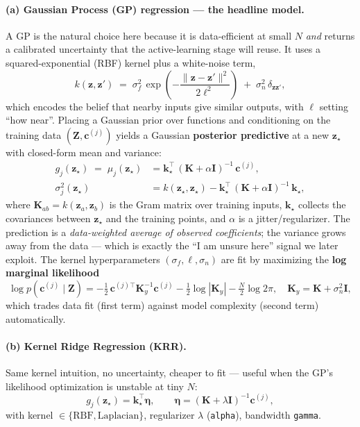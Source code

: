\documentclass[11pt]{article}
\newcommand{\bz}{\mathbf{z}}
\newcommand{\bc}{\mathbf{c}}
\newcommand{\bK}{\mathbf{K}}
\newcommand{\bI}{\mathbf{I}}
\begin{document}
\paragraph{(a) Gaussian Process (GP) regression --- the headline model.} A GP is the natural
choice here because it is data-efficient at small $N$ \emph{and} returns a calibrated uncertainty
that the active-learning stage will reuse. It uses a squared-exponential (RBF) kernel plus a
white-noise term,
\begin{equation}
k(\bz,\bz') \;=\; \sigma_f^2\,\exp\!\left(-\frac{\|\bz-\bz'\|^2}{2\ell^2}\right) \;+\; \sigma_n^2\,\delta_{\bz\bz'} ,
\end{equation}
which encodes the belief that nearby inputs give similar outputs, with $\ell$ setting ``how near''.
Placing a Gaussian prior over functions and conditioning on the training data
$(\mathbf{Z},\bc^{(j)})$ yields a Gaussian \textbf{posterior predictive} at a new $\bz_\star$ with
closed-form mean and variance:
\begin{align}
g_j(\bz_\star) \;=\; \mu_j(\bz_\star) &= \mathbf{k}_\star^\top\,(\bK+\alpha\bI)^{-1}\,\bc^{(j)},\\[2pt]
\sigma_j^2(\bz_\star) &= k(\bz_\star,\bz_\star) - \mathbf{k}_\star^\top\,(\bK+\alpha\bI)^{-1}\,\mathbf{k}_\star,
\end{align}
where $\bK_{ab}=k(\bz_a,\bz_b)$ is the Gram matrix over training inputs, $\mathbf{k}_\star$ collects
the covariances between $\bz_\star$ and the training points, and $\alpha$ is a jitter/regularizer.
The prediction is a \emph{data-weighted average of observed coefficients}; the variance grows away
from the data --- which is exactly the ``I am unsure here'' signal we later exploit. The kernel
hyperparameters $(\sigma_f,\ell,\sigma_n)$ are fit by maximizing the \textbf{log marginal
likelihood}
\begin{equation}
\log p(\bc^{(j)}\mid\mathbf{Z}) = -\tfrac{1}{2}\,\bc^{(j)\top}\bK_y^{-1}\bc^{(j)} - \tfrac{1}{2}\log|\bK_y| - \tfrac{N}{2}\log 2\pi,
\quad \bK_y=\bK+\sigma_n^2\bI,
\end{equation}
which trades data fit (first term) against model complexity (second term) automatically.

\paragraph{(b) Kernel Ridge Regression (KRR).} Same kernel intuition, no uncertainty, cheaper to
fit --- useful when the GP's likelihood optimization is unstable at tiny $N$:
\begin{equation}
g_j(\bz_\star)=\mathbf{k}_\star^\top\bm{\eta},\qquad
\bm{\eta}=(\bK+\lambda\bI)^{-1}\bc^{(j)},
\end{equation}
with kernel $\in\{\text{RBF},\text{Laplacian}\}$, regularizer $\lambda$ (\texttt{alpha}), bandwidth
\texttt{gamma}.
\end{document}
